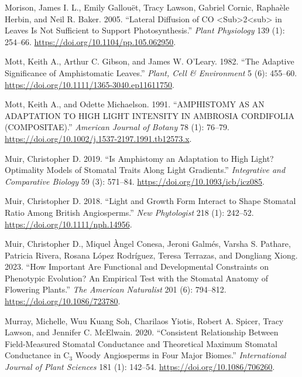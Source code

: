 \documentclass[12pt,halfline,a4paper,]{ouparticle}
\newlength{\cslhangindent}
\newlength{\cslentryspacingunit} %
\newenvironment{CSLReferences}[2] %
 {%
  \setlength{\parindent}{0pt}
  \ifodd #1
  \let\oldpar\par
  \def\par{\hangindent=\cslhangindent\oldpar}
  \fi
  \setlength{\parskip}{#2\cslentryspacingunit}
 }%
 {}
\begin{document}
\begin{CSLReferences}{1}{0}
\leavevmode{}%
Morison, James I. L., Emily Gallouët, Tracy Lawson, Gabriel Cornic,
Raphaèle Herbin, and Neil R. Baker. 2005. {``Lateral {Diffusion} of {CO}
{\textless{}}Sub{\textgreater{}}2{\textless{}}sub{\textgreater{}} in
{Leaves} {Is} {Not} {Sufficient} to {Support} {Photosynthesis}.''}
\emph{Plant Physiology} 139 (1): 254--66.
\url{https://doi.org/10.1104/pp.105.062950}.

\leavevmode{}%
Mott, Keith A., Arthur C. Gibson, and James W. O'Leary. 1982. {``The
Adaptive Significance of Amphistomatic Leaves.''} \emph{Plant, Cell \&
Environment} 5 (6): 455--60.
\url{https://doi.org/10.1111/1365-3040.ep11611750}.

\leavevmode{}%
Mott, Keith A., and Odette Michaelson. 1991. {``{AMPHISTOMY} {AS} {AN}
{ADAPTATION} {TO} {HIGH} {LIGHT} {INTENSITY} {IN} {AMBROSIA}
{CORDIFOLIA} ({COMPOSITAE}).''} \emph{American Journal of Botany} 78
(1): 76--79. \url{https://doi.org/10.1002/j.1537-2197.1991.tb12573.x}.

\leavevmode{}%
Muir, Christopher D. 2019. {``Is {Amphistomy} an {Adaptation} to {High}
{Light}? {Optimality} {Models} of {Stomatal} {Traits} Along {Light}
{Gradients}.''} \emph{Integrative and Comparative Biology} 59 (3):
571--84. \url{https://doi.org/10.1093/icb/icz085}.

\leavevmode{}%
Muir, Christopher D. 2018. {``Light and Growth Form Interact to Shape
Stomatal Ratio Among {British} Angiosperms.''} \emph{New Phytologist}
218 (1): 242--52. \url{https://doi.org/10.1111/nph.14956}.

\leavevmode{}%
Muir, Christopher D., Miquel Àngel Conesa, Jeroni Galmés, Varsha S.
Pathare, Patricia Rivera, Rosana López Rodríguez, Teresa Terrazas, and
Dongliang Xiong. 2023. {``How Important Are Functional and Developmental
Constraints on Phenotypic Evolution? {An} Empirical Test with the
Stomatal Anatomy of Flowering Plants.''} \emph{The American Naturalist}
201 (6): 794--812. \url{https://doi.org/10.1086/723780}.

\leavevmode{}%
Murray, Michelle, Wuu Kuang Soh, Charilaos Yiotis, Robert A. Spicer,
Tracy Lawson, and Jennifer C. McElwain. 2020. {``Consistent Relationship
Between Field-Measured Stomatal Conductance and Theoretical Maximum
Stomatal Conductance in {C}\(_{\textrm{3}}\) Woody Angiosperms in Four
Major Biomes.''} \emph{International Journal of Plant Sciences} 181 (1):
142--54. \url{https://doi.org/10.1086/706260}.


\end{CSLReferences}
\end{document}
